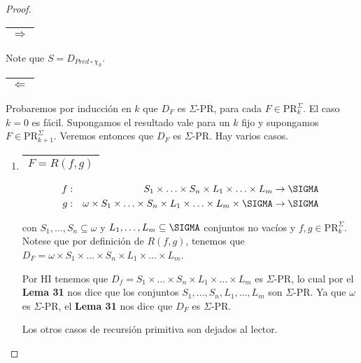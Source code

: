   \begin{proof}
    \begin{tabular}{|c|} \hline $\Rightarrow$\\\hline \end{tabular} Note que $S = D_{Pred \circ \chi_{S}}$.

    \begin{tabular}{|c|} \hline $\Leftarrow$\\\hline \end{tabular} Probaremos por inducción en $k$ que $D_{F}$ es
      $\Sigma$-PR, para cada $F \in \mathrm{PR}_{k}^{\Sigma}$. El caso $k=0$ es fácil. Supongamos el resultado vale para
      un $k$ fijo y supongamos $F \in \mathrm{PR}_{k+1}^{\Sigma}$. Veremos entonces que $D_{F}$ es $\Sigma$-PR. Hay
      varios casos.

    \begin{enumerate}
      \item \begin{tabular}{|c|} \hline $F = R(f, g)$\\\hline \end{tabular}
        \begin{eqnarray}
          \nonumber f &:& S_{1} \times \dotsc \times S_{n} \times L_{1} \times \dotsc \times L_{m} \rightarrow \SIGMA \\
          \nonumber g &:& \omega \times S_{1} \times \dotsc \times S_{n} \times L_{1} \times \dotsc \times L_{m} \times
          \SIGMA \rightarrow \SIGMA
        \end{eqnarray}

        \par con $S_{1}, \dotsc, S_{n} \subseteq \omega$ y $L_{1}, \dotsc, L_{m} \subseteq \SIGMA$ conjuntos no vacíos
        y $f, g \in \mathrm{PR}_{k}^{\Sigma}$. Notese que por definición de $R(f, g)$, tenemos que $D_{F} = \omega
        \times S_{1} \times \dotsc \times S_{n} \times L_{1} \times \dotsc \times L_{m}$.

        \par Por HI tenemos que $D_{f} = S_{1} \times \dotsc \times S_{n} \times L_{1} \times \dotsc \times L_{m}$ es
        $\Sigma$-PR, lo cual por el \textbf{Lema 31} nos dice que los conjuntos $S_{1}, \dotsc, S_{n}, L_{1}, \dotsc,
        L_{m}$ son $\Sigma$-PR. Ya que $\omega$ es $\Sigma$-PR, el \textbf{Lema 31} nos dice que $D_{F}$ es $\Sigma$-PR.

        \par Los otros casos de recursión primitiva son dejados al lector.


\end{enumerate}
\end{proof}
